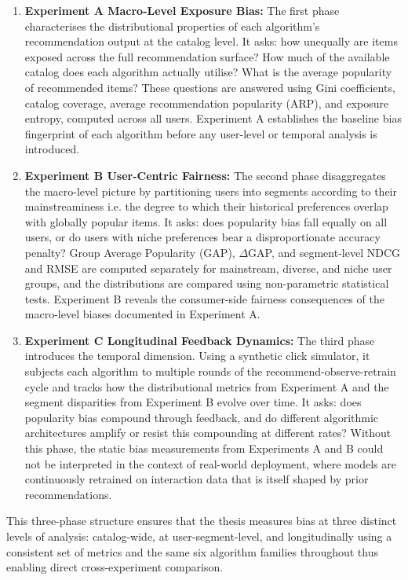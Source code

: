 \documentclass[11pt,a4paper]{report}
\begin{document}
\begin{enumerate}
    \item \textbf{Experiment A   Macro-Level Exposure Bias:} The first phase characterises the distributional properties of each algorithm's recommendation output at the catalog level. It asks: how unequally are items exposed across the full recommendation surface? How much of the available catalog does each algorithm actually utilise? What is the average popularity of recommended items? These questions are answered using Gini coefficients, catalog coverage, average recommendation popularity (ARP), and exposure entropy, computed across all users. Experiment A establishes the baseline bias fingerprint of each algorithm before any user-level or temporal analysis is introduced.

    \item \textbf{Experiment B   User-Centric Fairness:} The second phase disaggregates the macro-level picture by partitioning users into segments according to their mainstreaminess i.e. the degree to which their historical preferences overlap with globally popular items. It asks: does popularity bias fall equally on all users, or do users with niche preferences bear a disproportionate accuracy penalty? Group Average Popularity (GAP), $\Delta$GAP, and segment-level NDCG and RMSE are computed separately for mainstream, diverse, and niche user groups, and the distributions are compared using non-parametric statistical tests. Experiment B reveals the consumer-side fairness consequences of the macro-level biases documented in Experiment A.

    \item \textbf{Experiment C   Longitudinal Feedback Dynamics:} The third phase introduces the temporal dimension. Using a synthetic click simulator, it subjects each algorithm to multiple rounds of the recommend-observe-retrain cycle and tracks how the distributional metrics from Experiment A and the segment disparities from Experiment B evolve over time. It asks: does popularity bias compound through feedback, and do different algorithmic architectures amplify or resist this compounding at different rates? Without this phase, the static bias measurements from Experiments A and B could not be interpreted in the context of real-world deployment, where models are continuously retrained on interaction data that is itself shaped by prior recommendations.
\end{enumerate}

This three-phase structure ensures that the thesis measures bias at three distinct levels of analysis: catalog-wide, at user-segment-level, and longitudinally using a consistent set of metrics and the same six algorithm families throughout thus enabling direct cross-experiment comparison.
\end{document}
